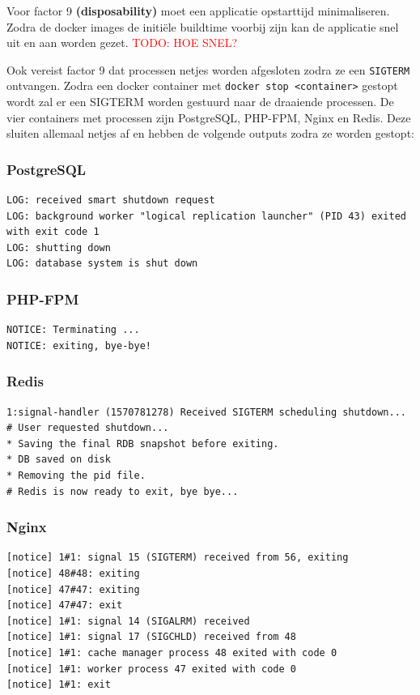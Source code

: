 Voor factor 9 \textbf{(disposability)} moet een applicatie opstarttijd minimaliseren. Zodra de docker images de initiële buildtime voorbij zijn kan de applicatie snel uit en aan worden gezet. \textcolor{red}{TODO: HOE SNEL?} %

Ook vereist factor 9 dat processen netjes worden afgesloten zodra ze een \texttt{SIGTERM} ontvangen. Zodra een docker container met \texttt{docker stop <container>} gestopt wordt zal er een SIGTERM worden gestuurd naar de draaiende processen. De vier containers met processen zijn PostgreSQL, PHP-FPM, Nginx en Redis. Deze sluiten allemaal netjes af en hebben de volgende outputs zodra ze worden gestopt:

\subsubsection{PostgreSQL}
\begin{verbatim}
LOG: received smart shutdown request
LOG: background worker "logical replication launcher" (PID 43) exited with exit code 1
LOG: shutting down
LOG: database system is shut down
\end{verbatim}

\subsubsection{PHP-FPM}
\begin{verbatim}
NOTICE: Terminating ...
NOTICE: exiting, bye-bye!
\end{verbatim}

\subsubsection{Redis}
\begin{verbatim}
1:signal-handler (1570781278) Received SIGTERM scheduling shutdown...
# User requested shutdown...
* Saving the final RDB snapshot before exiting.
* DB saved on disk
* Removing the pid file.
# Redis is now ready to exit, bye bye...
\end{verbatim}

\subsubsection{Nginx}
\begin{verbatim}
[notice] 1#1: signal 15 (SIGTERM) received from 56, exiting
[notice] 48#48: exiting
[notice] 47#47: exiting
[notice] 47#47: exit
[notice] 1#1: signal 14 (SIGALRM) received
[notice] 1#1: signal 17 (SIGCHLD) received from 48
[notice] 1#1: cache manager process 48 exited with code 0
[notice] 1#1: worker process 47 exited with code 0
[notice] 1#1: exit
\end{verbatim}

